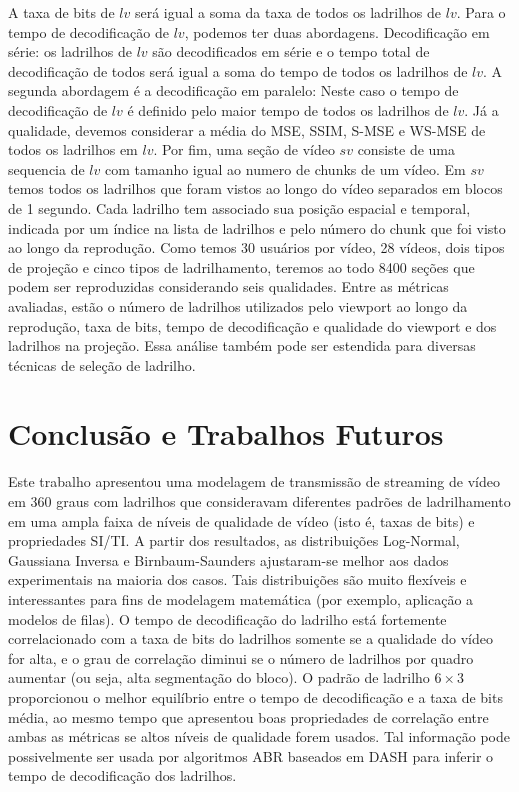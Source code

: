 {A taxa de bits de $lv$ será igual a soma da taxa de todos os ladrilhos de $lv$. Para o tempo de decodificação de $lv$, podemos ter duas abordagens. Decodificação em série: os ladrilhos de $lv$ são decodificados em série e o tempo total de decodificação de todos será igual a soma do tempo de todos os ladrilhos de $lv$. A segunda abordagem é a decodificação em paralelo: Neste caso o tempo de decodificação de $lv$ é definido pelo maior tempo de todos os ladrilhos de $lv$. Já a qualidade, devemos considerar a média do MSE, SSIM, S-MSE e WS-MSE de todos os ladrilhos em $lv$. Por fim, uma seção de vídeo $sv$ consiste de uma sequencia de $lv$ com tamanho igual ao numero de chunks de um vídeo. Em $sv$ temos todos os ladrilhos que foram vistos ao longo do vídeo separados em blocos de 1 segundo. Cada ladrilho tem associado sua posição espacial e temporal, indicada por um índice na lista de ladrilhos e pelo número do chunk que foi visto ao longo da reprodução. Como temos 30 usuários por vídeo, 28 vídeos, dois tipos de projeção e cinco tipos de ladrilhamento, teremos ao todo 8400 seções que podem ser reproduzidas considerando seis qualidades. Entre as métricas avaliadas, estão o número de ladrilhos utilizados pelo viewport ao longo da reprodução, taxa de bits, tempo de decodificação e qualidade do viewport e dos ladrilhos na projeção. Essa análise também pode ser estendida para diversas técnicas de seleção de ladrilho.


\chapter{Conclusão e Trabalhos Futuros}\label{Cap:Conclusion}

Este trabalho apresentou uma modelagem de transmissão de streaming de vídeo em 360 graus com ladrilhos que consideravam diferentes padrões de ladrilhamento em uma ampla faixa de níveis de qualidade de vídeo (isto é, taxas de bits) e propriedades SI/TI. A partir dos resultados, as distribuições Log-Normal, Gaussiana Inversa e Birnbaum-Saunders ajustaram-se melhor aos dados experimentais na maioria dos casos. Tais distribuições são muito flexíveis e interessantes para fins de modelagem matemática (por exemplo, aplicação a modelos de filas). O tempo de decodificação do ladrilho está fortemente correlacionado com a taxa de bits do ladrilhos somente se a qualidade do vídeo for alta, e o grau de correlação diminui se o número de ladrilhos por quadro aumentar (ou seja, alta segmentação do bloco). O padrão de ladrilho $6 \times 3$ proporcionou o melhor equilíbrio entre o tempo de decodificação e a taxa de bits média, ao mesmo tempo que apresentou boas propriedades de correlação entre ambas as métricas se altos níveis de qualidade forem usados. Tal informação pode possivelmente ser usada por algoritmos ABR baseados em DASH para inferir o tempo de decodificação dos ladrilhos.

}
